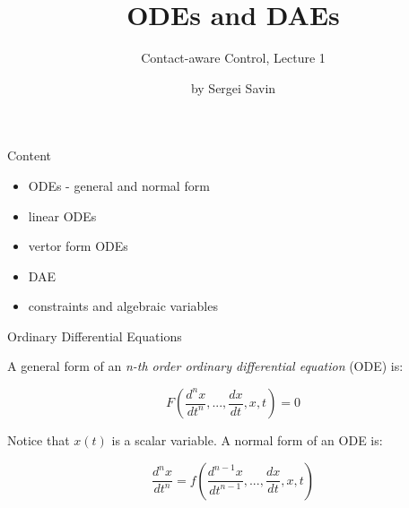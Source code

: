 \documentclass{beamer}
\title{ODEs and DAEs}
\subtitle{Contact-aware Control, Lecture 1}
\author{by Sergei Savin}
\date{\mydate}
\begin{document}
\maketitle


\begin{frame}{Content}

\begin{itemize}
\item ODEs - general and normal form
\item linear ODEs
\item vertor form ODEs
\item DAE
\item constraints and algebraic variables
\end{itemize}

\end{frame}




\begin{frame}{Ordinary Differential Equations}
\begin{flushleft}

A general form of an \emph{n-th order ordinary differential equation} (ODE) is:

\begin{equation}
	F \left( \frac{d^n x}{dt^n}, ..., \frac{d x}{dt}, x, t  \right) = 0
\end{equation}

\bigskip

Notice that $x(t)$ is a scalar variable. A normal form of an ODE is:

\begin{equation}
	\frac{d^n x}{dt^n} = f \left( \frac{d^{n-1} x}{dt^{n-1}}, ..., \frac{d x}{dt}, x, t  \right)
\end{equation}

\end{flushleft}
\end{frame}
\end{document}
